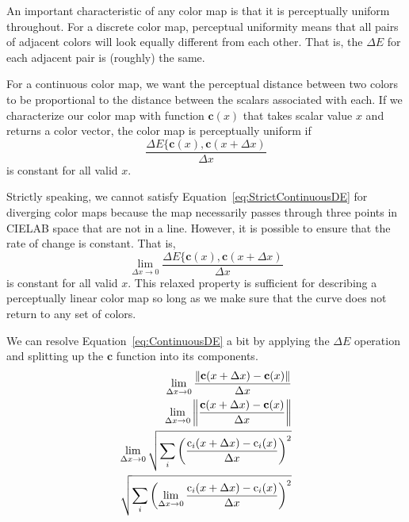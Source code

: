 \documentclass{acmsiggraph}               %
\newcommand{\Lab}{CIELAB\xspace}
\newcommand{\DeltaE}{\ensuremath{\Delta{}E}\xspace}
\newcommand*{\cvec}[1]{\mathbf{#1}}
\begin{document}
An important characteristic of any color map is that it is perceptually
uniform throughout.  For a discrete color map, perceptual uniformity means
that all pairs of adjacent colors will look equally different from each
other.  That is, the \DeltaE for each adjacent pair is (roughly) the same.

For a continuous color map, we want the perceptual distance between two
colors to be proportional to the distance between the scalars associated
with each.    If we characterize our color map with function $\cvec{c}(x)$
that takes scalar value $x$ and returns a color vector, the color map is
perceptually uniform if
\begin{equation}
  \frac{\DeltaE\{\cvec{c}(x),\cvec{c}(x+\Delta{x})}{\Delta{}x}
  \label{eq:StrictContinuousDE}
\end{equation}
is constant for all valid $x$.

Strictly speaking, we cannot satisfy Equation~\ref{eq:StrictContinuousDE}
for diverging color maps because the map necessarily passes through three
points in \Lab space that are not in a line.  However, it is possible to
ensure that the rate of change is constant.  That is,
\begin{equation}
  \lim_{\Delta{}x \rightarrow 0}{
    \frac{\DeltaE\{\cvec{c}(x),\cvec{c}(x+\Delta{x})}{\Delta{}x} }
  \label{eq:ContinuousDE}
\end{equation}
is constant for all valid $x$.  This relaxed property is sufficient for
describing a perceptually linear color map so long as we make sure that the
curve does not return to any set of colors.

We can resolve Equation~\ref{eq:ContinuousDE} a bit by applying the \DeltaE
operation and splitting up the $\cvec{c}$ function into its components.
\begin{equation}
  \begin{split}
    { \lim_{\Delta x \rightarrow 0}
      \frac{\left\lVert \cvec{c}(x+\Delta x) - \cvec{c}(x) \right\rVert}
      {\Delta x}} \\
    { \lim_{\Delta x \rightarrow 0}
      \left\lVert \frac{\cvec{c}(x+\Delta x)- \cvec{c}(x)}
	  {\Delta x} \right\rVert } \\
    { \lim_{\Delta x \rightarrow 0}
      \sqrtsign{ \sum_i \left( \frac
	  {\operatorname{c}_i(x+\Delta x)
	    - \operatorname{c}_i(x)}
	  {\Delta x} \right)^2 } } \\
    {\sqrtsign{ \sum_i \left( \lim_{\Delta x \rightarrow 0}
       \frac
	  {\operatorname{c}_i(x+\Delta x)
	    - \operatorname{c}_i(x)}
	  {\Delta x} \right)^2 } }
  \end{split}
  \label{eqn:dE_limit}
\end{equation}
\end{document}
